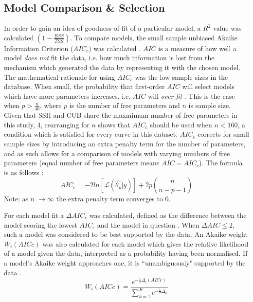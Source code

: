 \documentclass[11pt]{article}
\begin{document}
        \subsection{Model Comparison \& Selection}
            In order to gain an idea of goodness-of-fit of a particular model, a $R^2$ value was calculated $\left(1 - \frac{RSS}{TSS}\right)$. To compare models, the small sample unbiased Akaike Information Criterion ($AIC_c$) was calculated \cite{johnson2004model, wagenmakers2004aic}. $AIC$ is a measure of how well a model \textit{does not} fit the data, i.e. how much information is lost from the mechanism which generated the data by representing it with the chosen model. The mathematical rationale for using $AIC_c$ was the low sample sizes in the database. When small, the probability that first-order $AIC$ will select models which have more parameters increases, i.e. $AIC$ will \textit{over fit} . This is the case when $p > \frac{n}{40}$, where $p$ is the number of free parameters and $n$ is sample size. Given that SSH and CUB share the maxmimum number of free parameters in this study, 4, rearranging for $n$ shows that $AIC_c$ should be used when $n < 160$, a condition which is satisfied for every curve in this dataset. $AIC_c$ corrects for small sample sizes by introducing an extra penalty term for the number of parameters, and as such allows for a comparison of models with varying numbers of free parameters (equal number of free parameters means $AIC = AIC_c$). The formula is as follows :
            \begin{equation}
                AIC_c = -2ln[\mathcal{L}(\hat{\theta_p}|y)] + 2p\left(\frac{n}{n - p -1} \right) 
            \end{equation}
            Note: as n $\rightarrow \infty$ the extra penalty term converges to $0$.
            
            For each model fit a $\Delta AIC_c$ was calculated, defined as the difference between the model scoring the lowest $AIC_c$ and the model in question . When $\Delta AIC \leq 2$, such a model was considered to be best supported by the data. An Akaike weight $W_i(AICc)$ was also calculated for each model which gives the relative likelihood of a model given the data, interpreted as a probability having been normalised. If a model's Akaike weight approaches one, it is ``unambiguously" supported by the data .
            \begin{equation}
                W_i(AICc) = \frac{e^{-\frac{1}{2}\Delta_i(AICc)}}{\sum_{k=1}^{K}e^{-\frac{1}{2}\Delta_k}}
            \end{equation}
            
\end{document}
